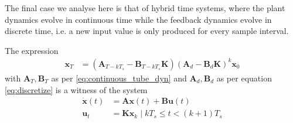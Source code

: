 \documentclass[sigconf]{llncs}
\newcommand{\mat}[1]{\boldsymbol{#1}}
\renewcommand{\vec}[1]{\boldsymbol{#1}}
\begin{document}
The final case we analyse here is that of hybrid time systems, where the
plant dynamics evolve in continuous time while the feedback dynamics evolve
in discrete time, i.e. a new input value is only produced for every sample interval.

\begin{theorem}
The expression
 \begin{align}
 \vec{x}_{T} &= (\mat{A}_{T-kT_s}-\mat{B}_{T-kT_s}\mat{K}) (\mat{A}_d-\mat{B}_d\mat{K})^k\vec{x}_0
 \label{eq:cyber_feedback}
 \end{align}
 with $\mat{A}_T, \mat{B}_T$ as per \eqref{eq:continuous_tube_dyn} and $\mat{A}_d, \mat{B}_d$ as per equation \eqref{eq:discretize} is a witness of the system
 \begin{align}
 \dot{\vec{x}}(t) &= \mat{A}\vec{x}(t)+\mat{B}\vec{u}(t)\nonumber\\
 \vec{u}_t&=\mat{K}\vec{x}_k  \mid  kT_s \leq t < (k+1)T_s
 \end{align}
 \end{theorem}

\end{document}
